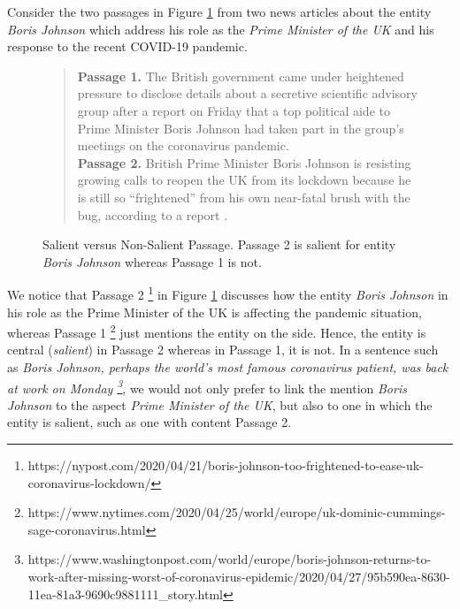 Consider the two passages in Figure \ref{fig:Salience} from two news articles about the entity \textit{Boris Johnson} which address his role as the \textit{Prime Minister of the UK} and his response to the recent COVID-19 pandemic.
\begin{figure}[t]
    \centering
   \begin{quote}
\textbf{Passage 1.} The British government came under heightened pressure to disclose details about a secretive scientific advisory group after a report on Friday that a top political aide to Prime Minister Boris Johnson had taken part in the group’s meetings on the coronavirus pandemic. \\
\textbf{Passage 2.} British Prime Minister Boris Johnson is resisting growing calls to reopen the UK from its lockdown because he is still so “frightened” from his own near-fatal brush with the bug, according to a report .
\end{quote}
    \caption{Salient versus Non-Salient Passage. Passage 2 is salient for entity \textit{Boris Johnson} whereas Passage 1 is not.}
    \label{fig:Salience}
\end{figure}
We notice that Passage 2 \footnote{https://nypost.com/2020/04/21/boris-johnson-too-frightened-to-ease-uk-coronavirus-lockdown/} in Figure \ref{fig:Salience} discusses how the entity \textit{Boris Johnson} in his role as the Prime Minister of the UK is affecting the pandemic situation, whereas Passage 1 \footnote{https://www.nytimes.com/2020/04/25/world/europe/uk-dominic-cummings-sage-coronavirus.html} just mentions the entity on the side. Hence, the entity is central (\textit{salient}) in Passage 2 whereas in Passage 1, it is not. 
In a sentence such as \textit{Boris Johnson, perhaps the world's most famous coronavirus patient, was back at work on Monday \footnote{https://www.washingtonpost.com/world/europe/boris-johnson-returns-to-work-after-missing-worst-of-coronavirus-epidemic/2020/04/27/95b590ea-8630-11ea-81a3-9690c9881111\_story.html}}, we would not only prefer to link the mention \textit{Boris Johnson} to the aspect \textit{Prime Minister of the UK}, but also to one in which the entity is salient, such as one with content Passage 2.



